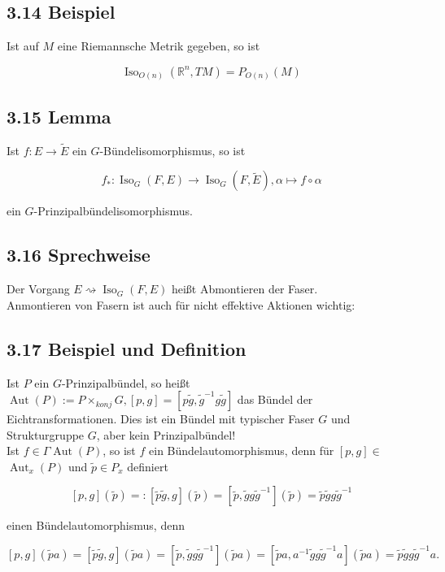 \subsection*{3.14 Beispiel}
Ist auf $M$ eine Riemannsche Metrik gegeben, so ist

$$
\operatorname{Iso}_{O(n)}\left(\mathbb{R}^{n}, T M\right)=P_{O(n)}(M)
$$

\subsection*{3.15 Lemma}
Ist $f: E \rightarrow \tilde{E}$ ein $G$-Bündelisomorphismus, so ist

$$
f_{*}: \operatorname{Iso}_{G}(F, E) \rightarrow \operatorname{Iso}_{G}(F, \tilde{E}), \alpha \mapsto f \circ \alpha
$$

ein $G$-Prinzipalbündelisomorphismus.

\subsection*{3.16 Sprechweise}
Der Vorgang $E \rightsquigarrow \operatorname{Iso}_{G}(F, E)$ heißt Abmontieren der Faser.\\
Anmontieren von Fasern ist auch für nicht effektive Aktionen wichtig:

\subsection*{3.17 Beispiel und Definition}
Ist $P$ ein $G$-Prinzipalbündel, so heißt $\operatorname{Aut}(P):=P \times_{k o n j} G,[p, g]=\left[p \tilde{g}, \tilde{g}^{-1} g \tilde{g}\right]$ das Bündel der Eichtransformationen. Dies ist ein Bündel mit typischer Faser $G$ und Strukturgruppe $G$, aber kein Prinzipalbündel!\\
Ist $f \in \Gamma \operatorname{Aut}(P)$, so ist $f$ ein Bündelautomorphismus, denn für $[p, g] \in$ $\operatorname{Aut}_{x}(P)$ und $\tilde{p} \in P_{x}$ definiert

$$
[p, g](\tilde{p})=:[\tilde{p} \tilde{g}, g](\tilde{p})=\left[\tilde{p}, \tilde{g} g \tilde{g}^{-1}\right](\tilde{p})=\tilde{p} \tilde{g} g \tilde{g}^{-1}
$$

einen Bündelautomorphismus, denn

$$
[p, g](\tilde{p} a)=[\tilde{p} \tilde{g}, g](\tilde{p} a)=\left[\tilde{p}, \tilde{g} g \tilde{g}^{-1}\right](\tilde{p} a)=\left[\tilde{p} a, a^{-1} \tilde{g} g \tilde{g}^{-1} a\right](\tilde{p} a)=\tilde{p} \tilde{g} g \tilde{g}^{-1} a .
$$

